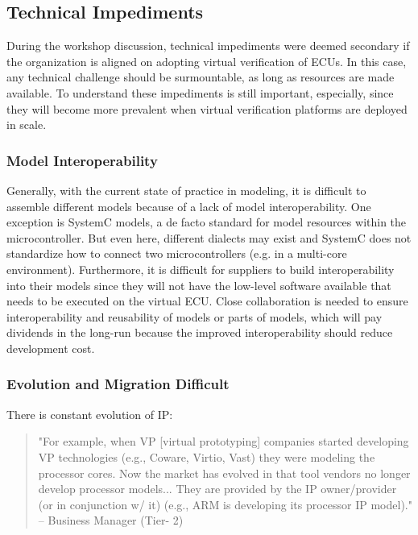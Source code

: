 \subsection{Technical Impediments}
During the workshop discussion, technical impediments were deemed secondary if the organization is aligned on adopting virtual verification of ECUs.
In this case, any technical challenge should be surmountable, as long as resources are made available.
To understand these impediments is still important, especially, since they will become more prevalent when virtual verification platforms are deployed in scale.

\subsubsection{Model Interoperability}
Generally, with the current state of practice in modeling, it is difficult to assemble different models because of a lack of model interoperability. One exception is SystemC models, a de facto standard for model resources within the microcontroller. But even here, different dialects may exist and SystemC does not standardize how to connect two microcontrollers (e.g. in a multi-core environment). Furthermore, it is difficult for suppliers to build interoperability into their models since they will not have the low-level software available that needs to be executed on the virtual ECU. Close collaboration is needed to ensure interoperability and reusability of models or parts of models, which will pay dividends in the long-run because the improved interoperability should reduce development cost.


\subsubsection{Evolution and Migration Difficult}
There is constant evolution of IP:
\begin{quote}
"For example, when VP [virtual prototyping] companies started developing VP technologies (e.g., Coware, Virtio, Vast) they were modeling the processor cores. Now the market has evolved in that tool vendors no longer develop processor models... They are provided by the IP owner/provider (or in conjunction w/ it) (e.g., ARM is developing its processor IP model)." 
-- Business Manager (Tier- 2)
\end{quote}

